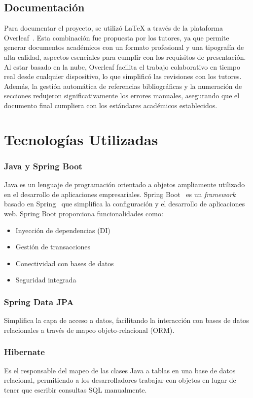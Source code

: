 \subsection{Documentación}\label{documentacion}
Para documentar el proyecto, se utilizó \LaTeX{} a través de la plataforma Overleaf~\cite{overleaf}. Esta combinación fue propuesta por los tutores, ya que permite generar documentos académicos con un formato profesional y una tipografía de alta calidad, aspectos esenciales para cumplir con los requisitos de presentación. Al estar basado en la nube, Overleaf facilita el trabajo colaborativo en tiempo real desde cualquier dispositivo, lo que simplificó las revisiones con los tutores. Además, la gestión automática de referencias bibliográficas y la numeración de secciones redujeron significativamente los errores manuales, asegurando que el documento final cumpliera con los estándares académicos establecidos.

\section{Tecnologías Utilizadas}
\subsubsection{Java y Spring Boot}
Java es un lenguaje de programación orientado a objetos ampliamente utilizado en el desarrollo de aplicaciones empresariales. Spring Boot~\cite{spring-boot} es un \emph{framework}~\cite{framework} basado en Spring~\cite{spring} que simplifica la configuración y el desarrollo de aplicaciones web.
Spring Boot proporciona funcionalidades como:
\begin{itemize}
	\tightlist
	\item
	Inyección de dependencias (DI)
	\item
	Gestión de transacciones
	\item
	Conectividad con bases de datos
	\item
	Seguridad integrada
\end{itemize}

\subsubsection{Spring Data JPA~\cite{spring-data-jpa}}
Simplifica la capa de acceso a datos, facilitando la interacción con bases de datos relacionales a través de mapeo objeto-relacional (ORM).

\subsubsection{Hibernate~\cite{hibernate}}
Es el responsable del mapeo de las clases Java a tablas en una base de datos relacional, permitiendo a los desarrolladores trabajar con objetos en lugar de tener que escribir consultas SQL manualmente.

